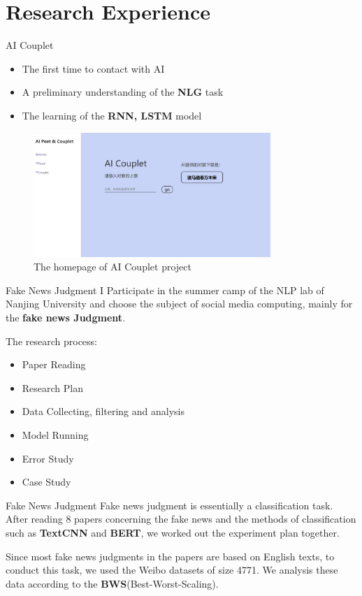\documentclass[10pt]{beamer}
\begin{document}
\section{Research Experience}
\begin{frame}[fragile]{AI Couplet}
\begin{itemize}
    \item The first time to contact with AI
    \item A preliminary understanding of the \textbf{NLG} task
    \item The learning of the \textbf{RNN, LSTM} model
\end{itemize}
\begin{figure}
    \centering
    \includegraphics[width=0.8\textwidth]{pic/ai_couplet.png}
    \caption{The homepage of AI Couplet project}
    \label{fig:my_label}
\end{figure}
\end{frame}

\begin{frame}[fragile]{Fake News Judgment}
I Participate in the summer camp of the NLP lab of Nanjing University and choose the subject of social media computing, mainly for the \textbf{fake news Judgment}.

The research process:
\begin{itemize}
    \item Paper Reading
    \item Research Plan
    \item Data Collecting, filtering and analysis
    \item Model Running
    \item Error Study
    \item Case Study
\end{itemize}
\end{frame}

\begin{frame}{Fake News Judgment}
Fake news judgment is essentially a classification task. After reading 8 papers concerning the fake news and the methods of classification such as \textbf{TextCNN}\cite{TextCNN} and \textbf{BERT}\cite{BERT}, we worked out the experiment plan together.

Since most fake news judgments in the papers are based on English texts, to conduct this task, we used the Weibo datasets of size 4771.
We analysis these data according to the \textbf{BWS}(Best-Worst-Scaling)\cite{BWS}.
\end{frame}
\end{document}

